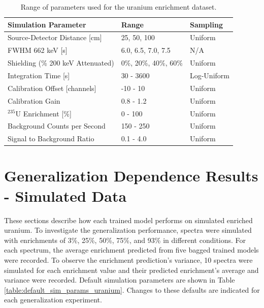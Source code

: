 \begin{table}[H]
\centering
\caption{Range of parameters used for the uranium enrichment dataset.}
\label{table:hyperparameter_dataset_full_parameters_enrichment}
\begin{tabular}{lll}
\hline
\textbf{Simulation Parameter} & \textbf{Range} & \textbf{Sampling} \\ \hline
Source-Detector Distance [cm] & 25, 50, 100 & Uniform \\ %
FWHM 662 keV [s] & 6.0, 6.5, 7.0, 7.5 & N/A \\ %
Shielding (\% 200 keV Attenuated) & 0\%, 20\%, 40\%, 60\% & Uniform \\ %
Integration Time [s] & 30 - 3600 & Log-Uniform \\ %
Calibration Offset [channels] & -10 - 10 & Uniform \\ %
Calibration Gain & 0.8 - 1.2 & Uniform \\ %
$^{235}$U Enrichment [\%] & 0 - 100 & Uniform \\ %
Background Counts per Second & 150 - 250 & Uniform \\ %
Signal to Background Ratio & 0.1 - 4.0 & Uniform \\ \hline
\end{tabular}
\end{table}


\section{Generalization Dependence Results - Simulated Data}

These sections describe how each trained model performs on simulated enriched uranium. To investigate the generalization performance, spectra were simulated with enrichments of 3\%, 25\%, 50\%, 75\%, and 93\% in different conditions. For each spectrum, the average enrichment predicted from five bagged trained models were recorded. To observe the enrichment prediction's variance, 10 spectra were simulated for each enrichment value and their predicted enrichment's average and variance were recorded. Default simulation parameters are shown in Table \ref{table:default_sim_params_uranium}. Changes to these defaults are indicated for each generalization experiment.

